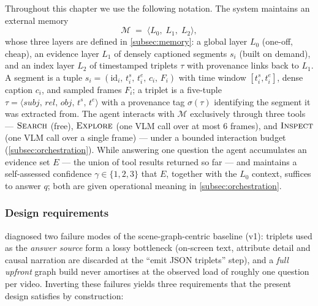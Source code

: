 Throughout this chapter we use the following notation. The system maintains an external memory
%
\begin{equation}
\label{eq:mem}
\mathcal{M} \;=\; \langle L_0,\; L_1,\; L_2 \rangle,
\end{equation}
%
whose three layers are defined in \cref{subsec:memory}: a global layer $L_0$ (one-off, cheap), an evidence layer
$L_1$ of densely captioned segments $s_i$ (built on demand), and an index layer $L_2$ of
timestamped triplets $\tau$ with provenance links back to $L_1$. A segment is a tuple
$s_i = (\mathrm{id}_i,\, t_i^{s},\, t_i^{e},\, c_i,\, F_i)$ with time window $[t_i^s, t_i^e]$,
dense caption $c_i$, and sampled frames $F_i$; a triplet is a five-tuple
$\tau = \langle \mathit{subj},\, \mathit{rel},\, \mathit{obj},\, t^{s},\, t^{e} \rangle$ with a
provenance tag $\sigma(\tau)$ identifying the segment it was extracted from. The agent interacts
with $\mathcal{M}$ exclusively through three tools --- $\textsc{Search}$ (free), $\textsc{Explore}$
(one VLM call over at most 6 frames), and $\textsc{Inspect}$ (one VLM call over a single frame) ---
under a bounded interaction budget (\cref{subsec:orchestration}). While answering one question the agent accumulates an
evidence set $E$ --- the union of tool results returned so far --- and maintains a self-assessed
confidence $\gamma \in \{1, 2, 3\}$ that $E$, together with the $L_0$ context, suffices to answer
$q$; both are given operational meaning in \cref{subsec:orchestration}.

\subsubsection{Design requirements}
\label{subsubsec:requirements}

 diagnosed two failure modes of the scene-graph-centric baseline (v1): triplets used as
the \emph{answer source} form a lossy bottleneck (on-screen text, attribute detail and causal narration
are discarded at the ``emit JSON triplets'' step), and a \emph{full upfront} graph build never amortises
at the observed load of roughly one question per video. Inverting these failures yields three
requirements that the present design satisfies by construction:

